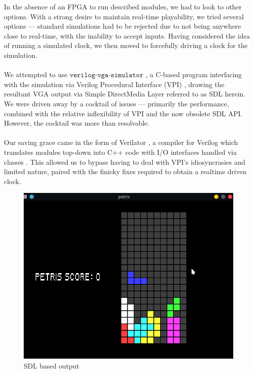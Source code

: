 In the absence of an FPGA to run described modules, 
we had to look to other options. With a strong desire to 
maintain real-time playability, we tried several options ---
standard simulations had to be rejected due to not being 
anywhere close to real-time, with the inability to accept inputs.
Having considered the idea of running a simulated clock, we then
moved to forcefully driving a clock for the simulation.
\\
\\
 We attempted to use \(\texttt{verilog-vga-simulator}\) \cite{vga-simulator},
a C-based program interfacing with the simulation via 
Verilog Procedural Interface (VPI) \cite{vpi}, drawing the resultant
VGA output via Simple DirectMedia Layer \cite{sdl2} referred to as 
SDL herein. We were driven away by a cocktail of issues --- primarily
the performance, combined with the relative inflexibility of VPI 
and the now obsolete \cite{sdl_obsolete} SDL API. However, the cocktail
was more than resolvable. 
\\
\\
Our saving grace came in the form of Verilator \cite{verilator}, a compiler for
Verilog which translates modules top-down into C++ code with
I/O interfaces handled via classes \cite{verilator-implement}. This allowed
us to bypass having to deal with VPI's idiosyncrasies and limited nature, paired
with the finicky fixes required to obtain a realtime driven clock.
\\

\begin{figure}[h]
    \centering
    \includegraphics[scale=0.6]{fig/ouput_screenshot.png}
    \caption{SDL based output}
\label{fig:output}
\end{figure}


